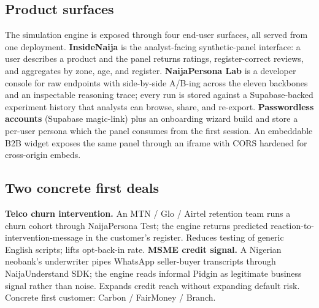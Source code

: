 \documentclass[sigconf,nonacm,balance]{acmart}
\begin{document}
\subsection*{Product surfaces}
The simulation engine is exposed through four end-user surfaces, all served
from one deployment. \textbf{InsideNaija} is the analyst-facing
synthetic-panel interface: a user describes a product and the panel returns
ratings, register-correct reviews, and aggregates by zone, age, and
register. \textbf{NaijaPersona Lab} is a developer console for raw
endpoints with side-by-side A/B-ing across the eleven backbones and an
inspectable reasoning trace; every run is stored against a Supabase-backed
experiment history that analysts can browse, share, and re-export.
\textbf{Passwordless accounts} (Supabase magic-link) plus an onboarding
wizard build and store a per-user persona which the panel consumes from the
first session. An embeddable B2B widget exposes the same panel through an
iframe with CORS hardened for cross-origin embeds.

\subsection*{Two concrete first deals}
\textbf{Telco churn intervention.} An MTN / Glo / Airtel retention team
runs a churn cohort through NaijaPersona Test; the engine returns predicted
reaction-to-intervention-message in the customer's register. Reduces
testing of generic English scripts; lifts opt-back-in rate.
\textbf{MSME credit signal.} A Nigerian neobank's underwriter pipes
WhatsApp seller-buyer transcripts through NaijaUnderstand SDK; the engine
reads informal Pidgin as legitimate business signal rather than noise.
Expands credit reach without expanding default risk. Concrete first
customer: Carbon / FairMoney / Branch.
\end{document}
